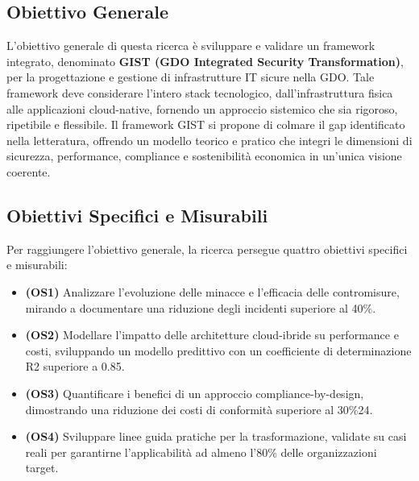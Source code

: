 \subsection{Obiettivo Generale}
L'obiettivo generale di questa ricerca è sviluppare e validare un framework integrato, denominato
\textbf{GIST (GDO Integrated Security Transformation)}, per la progettazione e gestione di infrastrutture IT sicure nella GDO. Tale framework deve considerare l'intero stack tecnologico, dall'infrastruttura fisica alle applicazioni cloud-native, fornendo un approccio sistemico che sia rigoroso, ripetibile e flessibile. 
Il framework GIST si propone di colmare il gap identificato nella letteratura, offrendo un modello teorico e pratico che integri le dimensioni di sicurezza, performance, compliance e sostenibilità economica in un'unica visione coerente.

\subsection{Obiettivi Specifici e Misurabili}
Per raggiungere l'obiettivo generale, la ricerca persegue quattro obiettivi specifici e misurabili:
\begin{itemize}
    \item \textbf{(OS1)} Analizzare l'evoluzione delle minacce e l'efficacia delle contromisure, mirando a documentare una riduzione degli incidenti superiore al 40\%.
    \item \textbf{(OS2)} Modellare l'impatto delle architetture cloud-ibride su performance e costi, sviluppando un modello predittivo con un coefficiente di determinazione R2 superiore a 0.85.
    \item \textbf{(OS3)} Quantificare i benefici di un approccio compliance-by-design, dimostrando una riduzione dei costi di conformità superiore al 30\%24.
    \item \textbf{(OS4)} Sviluppare linee guida pratiche per la trasformazione, validate su casi reali per garantirne l'applicabilità ad almeno l'80\% delle organizzazioni target.

\end{itemize}

